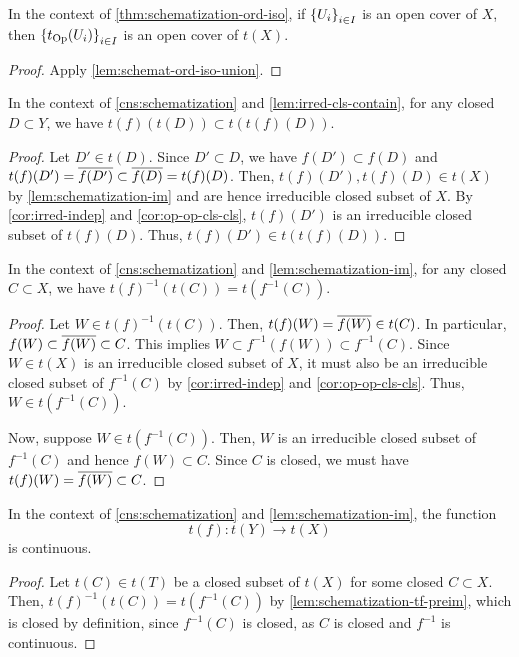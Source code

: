 \begin{thm}\label{thm:schemat-cover}
In the context of \cref{thm:schematization-ord-iso},
if $\set{U_i}_{i \in I}$ is an open cover of $X$, then
$\set{t_\Op(U_i)}_{i \in I}$ is an open cover of $t(X)$.
\end{thm}
\begin{proof}
Apply \cref{lem:schemat-ord-iso-union}.
\end{proof}

\begin{lem}
In the context of \cref{cns:schematization} and \cref{lem:irred-cls-contain},
for any closed $D \subset Y$, we have $t(f)(t(D)) \subset t(t(f)(D))$.
\end{lem}
\begin{proof}
Let $D' \in t(D)$.
Since $D' \subset D$, we have $f(D') \subset f(D)$
and $t(f)(D') = \cls{f(D')} \subset \cls{f(D)} = t(f)(D)$.
Then, $t(f)(D'), t(f)(D) \in t(X)$ by \cref{lem:schematization-im} and are
hence irreducible closed subset of $X$. By \cref{cor:irred-indep}
and \cref{cor:op-op-cls-cls}, $t(f)(D')$ is an irreducible closed
subset of $t(f)(D)$. Thus,
$t(f)(D') \in t(t(f)(D))$.
\end{proof}

\begin{lem}\label{lem:schematization-tf-preim}
In the context of \cref{cns:schematization}
and \cref{lem:schematization-im}, for any
closed $C \subset X$, we have $t(f)^{-1}(t(C)) = t(f^{-1}(C))$.
\end{lem}
\begin{proof}
Let $W \in t(f)^{-1}(t(C))$. Then, $t(f)(W) = \cls{f(W)} \in t(C)$.
In particular, $f(W) \subset \cls{f(W)} \subset C$. This implies
$W \subset f^{-1}(f(W)) \subset f^{-1}(C)$. Since $W \in t(X)$
is an irreducible closed subset of $X$, it must also
be an irreducible closed subset of $f^{-1}(C)$ by
\cref{cor:irred-indep} and \cref{cor:op-op-cls-cls}. Thus,
$W \in t(f^{-1}(C))$.

Now, suppose $W \in t(f^{-1}(C))$. Then, $W$ is an irreducible closed
subset of $f^{-1}(C)$ and hence $f(W) \subset C$. Since $C$
is closed, we must have $t(f)(W) = \cls{f(W)} \subset C$.
\end{proof}

\begin{thm}\label{thm:schematization-tf-cont}
In the context of \cref{cns:schematization}
and \cref{lem:schematization-im}, the function
\[
t(f) : t(Y) \to t(X)
\]
is continuous.
\end{thm}
\begin{proof}
Let $t(C) \in t(T)$ be a closed subset of $t(X)$ for some closed
$C \subset X$. Then, $t(f)^{-1}(t(C)) = t(f^{-1}(C))$ by
\cref{lem:schematization-tf-preim}, which is closed by definition, since
$f^{-1}(C)$ is closed, as $C$ is closed and $f^{-1}$ is continuous.
\end{proof}


